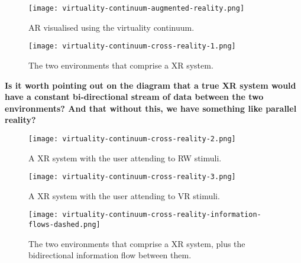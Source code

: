 \begin{figure}[h]
	\begin{center}
		\texttt{[image: virtuality-continuum-augmented-reality.png]}
		\caption{AR visualised using the virtuality continuum.}
		\label{virtuality-continuum-augmented-reality}
	\end{center}
\end{figure}

\begin{figure}[h]
	\begin{center}
		\texttt{[image: virtuality-continuum-cross-reality-1.png]}
		\caption{The two environments that comprise a XR system.}
		\label{virtuality-continuum-cross-reality-1}
	\end{center}
\end{figure}

\textbf{Is it worth pointing out on the diagram that a true XR system would have a constant bi-directional stream of data between the two environments? And that without this, we have something like parallel reality?}

\begin{figure}[h]
	\begin{center}
		\texttt{[image: virtuality-continuum-cross-reality-2.png]}
		\caption{A XR system with the user attending to RW stimuli.}
		\label{virtuality-continuum-cross-reality-2}
	\end{center}
\end{figure}

\begin{figure}[h]
	\begin{center}
		\texttt{[image: virtuality-continuum-cross-reality-3.png]}
		\caption{A XR system with the user attending to VR stimuli.}
		\label{virtuality-continuum-cross-reality-3}
	\end{center}
\end{figure}


\begin{figure}[h]
	\begin{center}
		\texttt{[image: virtuality-continuum-cross-reality-information-flows-dashed.png]}
		\caption{The two environments that comprise a XR system, plus the bidirectional information flow between them.}
	\end{center}
\end{figure}

